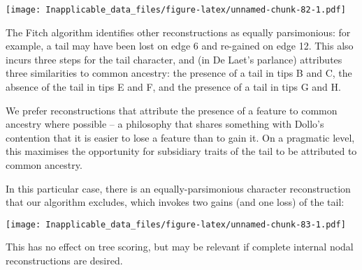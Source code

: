 \documentclass[]{book}
\theoremstyle{definition}
\theoremstyle{definition}
\theoremstyle{definition}
\theoremstyle{remark}
\begin{document}
\texttt{[image: Inapplicable\_data\_files/figure-latex/unnamed-chunk-82-1.pdf]}

The Fitch algorithm identifies other reconstructions as equally
parsimonious: for example, a tail may have been lost on edge 6 and
re-gained on edge 12. This also incurs three steps for the tail
character, and (in De Laet's parlance) attributes three similarities to
common ancestry: the presence of a tail in tips B and C, the absence of
the tail in tips E and F, and the presence of a tail in tips G and H.

We prefer reconstructions that attribute the presence of a feature to
common ancestry where possible -- a philosophy that shares something
with Dollo's contention that it is easier to lose a feature than to gain
it. On a pragmatic level, this maximises the opportunity for subsidiary
traits of the tail to be attributed to common ancestry.

In this particular case, there is an equally-parsimonious character
reconstruction that our algorithm excludes, which invokes two gains (and
one loss) of the tail:

\texttt{[image: Inapplicable\_data\_files/figure-latex/unnamed-chunk-83-1.pdf]}

This has no effect on tree scoring, but may be relevant if complete
internal nodal reconstructions are desired.


\end{document}
